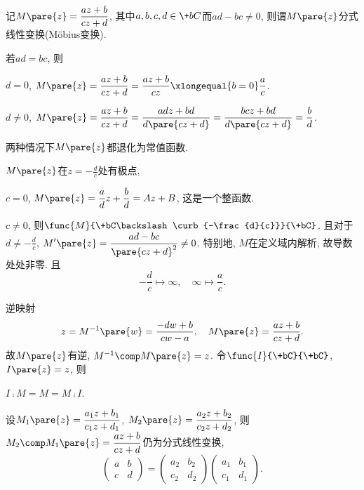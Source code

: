 \documentclass[../ComplexVariable.tex]{subfiles}
\begin{document}
\begin{definition}
    记$\displaystyle M\pare{z} = \frac{az+b}{cz+d}$, 其中$a,b,c,d\in\+bC$而$ad-bc\neq 0$, 则谓$M\pare{z}$分式线性变换(M\"obius变换).
\end{definition}
\begin{remark}
    若$ad=bc$, 则
    \begin{cenum}
        \item $d=0$, $\displaystyle M\pare{z} = \frac{az+b}{cz+d} = \frac{az+b}{cz} \xlongequal{b=0} \frac{a}{c}$.
        \item $d\neq 0$, $\displaystyle M\pare{z} = \frac{az+b}{cz+d} = \frac{adz+bd}{d\pare{cz+d}} = \frac{bcz+bd}{d\pare{cz+d}} = \frac{b}{d}$.
    \end{cenum}
    两种情况下$M\pare{z}$都退化为常值函数.
\end{remark}
$M\pare{z}$在$\displaystyle z = -\frac{d}{c}$处有极点,
\begin{cenum}
    \item $c=0$, $\displaystyle M\pare{z} = \frac{a}{d}z + \frac{b}{d} = Az+B$, 这是一个整函数.
    \item $c\neq 0$, 则$\displaystyle \func{M}{\+bC\backslash \curb{-\frac{d}{c}}}{\+bC}$. 且对于$\displaystyle d\neq -\frac{d}{c}$, $\displaystyle M'\pare{z} = \frac{ad-bc}{\pare{cz+d}^2} \neq 0$. 特别地, $M$在定义域内解析, 故导数处处非零. 且
    \[ -\frac{d}{c}\mapsto \infty,\quad \infty \mapsto \frac{a}{c}. \]
\end{cenum}
逆映射
\[ z = M^{-1}\pare{w} = \frac{-dw + b}{cw - a},\quad M\pare{z} = \frac{az+b}{cz+d}. \]
故$M\pare{z}$有逆, $M^{-1}\comp M\pare{z} = z$. 令$\func{I}{\+bC}{\+bC}$, $I\pare{z} = z$, 则
\begin{cenum}
    \item $I\comp M = M = M \comp I$.
    \item 设$\displaystyle M_1\pare{z} = \frac{a_1 z + b_1}{c_1 z + d_1}$, $\displaystyle M_2\pare{z} = \frac{a_2 z + b_2}{c_2 z + d_2}$, 则$\displaystyle M_2\comp M_1\pare{z} = \frac{az+b}{cz+d}$仍为分式线性变换,
    \[ \begin{pmatrix}
        a & b \\
        c & d
    \end{pmatrix} = \begin{pmatrix}
        a_2 & b_2 \\
        c_2 & d_2
    \end{pmatrix} \begin{pmatrix}
        a_1 & b_1 \\
        c_1 & d_1
    \end{pmatrix}. \]
\end{cenum}
\end{document}
